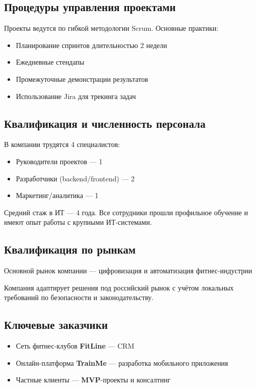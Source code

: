 \documentclass[14pt, russian]{matmex-diploma-custom}
\begin{document}
\subsection{Процедуры управления проектами}

Проекты ведутся по гибкой методологии Scrum. Основные практики:
\begin{itemize}[noitemsep]
  \item Планирование спринтов длительностью 2 недели
  \item Ежедневные стендапы
  \item Промежуточные демонстрации результатов
  \item Использование Jira для трекинга задач
\end{itemize}

\subsection{Квалификация и численность персонала}

В компании трудятся 4 специалистов:
\begin{itemize}[noitemsep]
  \item Руководители проектов — 1
  \item Разработчики (backend/frontend) — 2
  \item Маркетинг/аналитика — 1
\end{itemize}

Средний стаж в ИТ — 4 года. Все сотрудники прошли профильное обучение и имеют опыт работы с крупными ИТ-системами.

\subsection{Квалификация по рынкам}

Основной рынок компании — цифровизация и автоматизация фитнес-индустрии

Компания адаптирует решения под российский рынок с учётом локальных требований по безопасности и законодательству.

\subsection{Ключевые заказчики}

\begin{itemize}[noitemsep]
  \item Сеть фитнес-клубов \textbf{FitLine} — CRM
  \item Онлайн-платформа \textbf{TrainMe} — разработка мобильного приложения
  \item Частные клиенты — \textbf{MVP}-проекты и консалтинг
\end{itemize}
\end{document}
